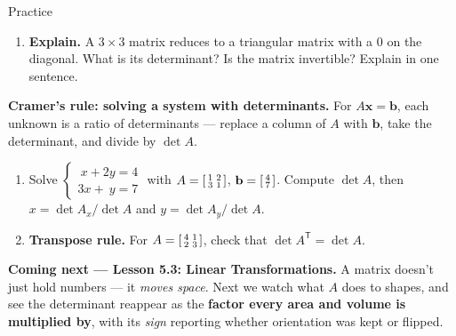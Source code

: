 \documentclass[10pt]{article}
\newcommand{\bb}{\mathbf{b}}
\newcommand{\xx}{\mathbf{x}}
\newcommand{\T}{\mathsf{T}}
\begin{document}
\begin{notesbox}{Practice}
\begin{enumerate}[leftmargin=1.9em, itemsep=11pt]
        $B=\begin{bmatrix} 2 & 0 \\ 1 & 4 \end{bmatrix}$. Compute $\det A$ and $\det B$, then find
        $\det(AB)$ (two ways: the product rule, and by multiplying $AB$ out). What is $\det A^{-1}$? 
  \item \textbf{Explain.} A $3\times3$ matrix reduces to a triangular matrix with a $0$ on the diagonal.
        What is its determinant? Is the matrix invertible? Explain in one sentence. 
\end{enumerate}
\end{notesbox}

\begin{extensionbox}
\textbf{Cramer's rule: solving a system with determinants.} For $A\xx=\bb$, each unknown is a ratio of
determinants --- replace a column of $A$ with $\bb$, take the determinant, and divide by $\det A$.
\begin{enumerate}[label=(\alph*), leftmargin=1.8em, itemsep=5pt]
  \item Solve $\begin{cases} \ x + 2y = 4 \\ 3x + \ y = 7 \end{cases}$ with
        $A=\begin{bsmallmatrix} 1 & 2 \\ 3 & 1 \end{bsmallmatrix}$, $\bb=\begin{bsmallmatrix} 4 \\ 7 \end{bsmallmatrix}$.
        Compute $\det A$, then $x=\det A_x/\det A$ and $y=\det A_y/\det A$.
  \item \textbf{Transpose rule.} For $A=\begin{bsmallmatrix} 4 & 1 \\ 2 & 3 \end{bsmallmatrix}$, check that $\det A^{\T}=\det A$.
\end{enumerate}
\end{extensionbox}

\begin{spiralbox}
\textbf{Coming next --- Lesson 5.3: Linear Transformations.} A matrix doesn't just hold numbers --- it
\emph{moves space}. Next we watch what $A$ does to shapes, and see the determinant reappear as the
\textbf{factor every area and volume is multiplied by}, with its \emph{sign} reporting whether
orientation was kept or flipped.
\end{spiralbox}
\end{document}
